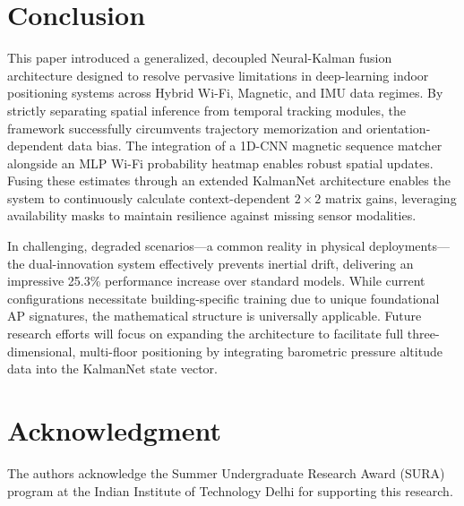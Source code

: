 \documentclass[conference]{IEEEtran}
\begin{document}
\section{Conclusion}\label{sec:conclusion}

This paper introduced a generalized, decoupled Neural-Kalman fusion architecture designed to resolve pervasive limitations in deep-learning indoor positioning systems across Hybrid Wi-Fi, Magnetic, and IMU data regimes. By strictly separating spatial inference from temporal tracking modules, the framework successfully circumvents trajectory memorization and orientation-dependent data bias. The integration of a 1D-CNN magnetic sequence matcher alongside an MLP Wi-Fi probability heatmap enables robust spatial updates. Fusing these estimates through an extended KalmanNet architecture enables the system to continuously calculate context-dependent $2\!\times\!2$ matrix gains, leveraging availability masks to maintain resilience against missing sensor modalities.

In challenging, degraded scenarios—a common reality in physical deployments—the dual-innovation system effectively prevents inertial drift, delivering an impressive 25.3\% performance increase over standard models. While current configurations necessitate building-specific training due to unique foundational AP signatures, the mathematical structure is universally applicable. Future research efforts will focus on expanding the architecture to facilitate full three-dimensional, multi-floor positioning by integrating barometric pressure altitude data into the KalmanNet state vector.

\section*{Acknowledgment}
The authors acknowledge the Summer Undergraduate Research Award (SURA) program at the Indian Institute of Technology Delhi for supporting this research.



\end{document}
